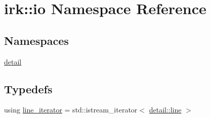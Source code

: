\hypertarget{namespaceirk_1_1io}{}\section{irk\+:\+:io Namespace Reference}
\label{namespaceirk_1_1io}
\subsection*{Namespaces}
\begin{DoxyCompactItemize}
\item 
 \mbox{\hyperlink{namespaceirk_1_1io_1_1detail}{detail}}
\end{DoxyCompactItemize}
\subsection*{Typedefs}
\begin{DoxyCompactItemize}
\item 
using \mbox{\hyperlink{namespaceirk_1_1io_aca7c3fe4077d1c97e51700fbf746d2e5}{line\+\_\+iterator}} = std\+::istream\+\_\+iterator$<$ \mbox{\hyperlink{classirk_1_1io_1_1detail_1_1line}{detail\+::line}} $>$
\end{DoxyCompactItemize}
